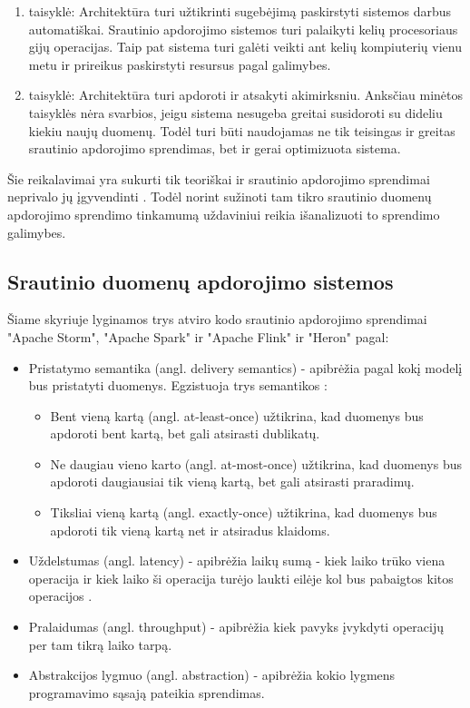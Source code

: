 \documentclass{VUMIFPSbakalaurinis}
\begin{document}
\begin{enumerate}[label=\arabic*]
    \item taisyklė: Architektūra turi užtikrinti sugebėjimą paskirstyti sistemos darbus automatiškai. Srautinio apdorojimo sistemos turi palaikyti kelių procesoriaus gijų operacijas. Taip pat sistema turi galėti veikti ant kelių kompiuterių vienu metu ir prireikus paskirstyti resursus pagal galimybes.
    \item taisyklė: Architektūra turi apdoroti ir atsakyti akimirksniu. Anksčiau minėtos taisyklės nėra svarbios, jeigu sistema nesugeba greitai susidoroti su dideliu kiekiu naujų duomenų. Todėl turi būti naudojamas ne tik teisingas ir greitas srautinio apdorojimo sprendimas, bet ir gerai optimizuota sistema.
\end{enumerate}\par 
Šie reikalavimai yra sukurti tik teoriškai ir srautinio apdorojimo sprendimai neprivalo jų įgyvendinti \cite{stonebraker20058}. 
Todėl norint sužinoti tam tikro srautinio duomenų apdorojimo sprendimo tinkamumą uždaviniui reikia išanalizuoti to sprendimo galimybes.   

\subsection{Srautinio duomenų apdorojimo sistemos}

Šiame skyriuje lyginamos trys atviro kodo srautinio apdorojimo sprendimai "Apache Storm", "Apache Spark" ir "Apache Flink" ir "Heron" pagal:
\begin{itemize}
    \item Pristatymo semantika (angl. delivery semantics) - apibrėžia pagal kokį modelį bus pristatyti duomenys. Egzistuoja trys semantikos \cite{ensar20}: 
    \begin{itemize}
        \item Bent vieną kartą (angl. at-least-once) užtikrina, kad duomenys bus apdoroti bent kartą, bet gali atsirasti dublikatų. 
        \item Ne daugiau vieno karto (angl. at-most-once) užtikrina, kad duomenys bus apdoroti daugiausiai tik vieną kartą, bet gali atsirasti praradimų. 
        \item Tiksliai vieną kartą (angl. exactly-once) užtikrina, kad duomenys bus apdoroti tik vieną kartą net ir atsiradus klaidoms.
    \end{itemize}
    \item Uždelstumas (angl. latency) - apibrėžia laikų sumą - kiek laiko trūko viena operacija ir kiek laiko ši operacija turėjo laukti eilėje kol bus pabaigtos kitos operacijos \cite{karimov2018benchmarking}.
    \item Pralaidumas (angl. throughput) - apibrėžia kiek pavyks įvykdyti operacijų per tam tikrą laiko tarpą.
    \item Abstrakcijos lygmuo (angl. abstraction) - apibrėžia kokio lygmens programavimo sąsają pateikia sprendimas.
\end{itemize}
\end{document}
